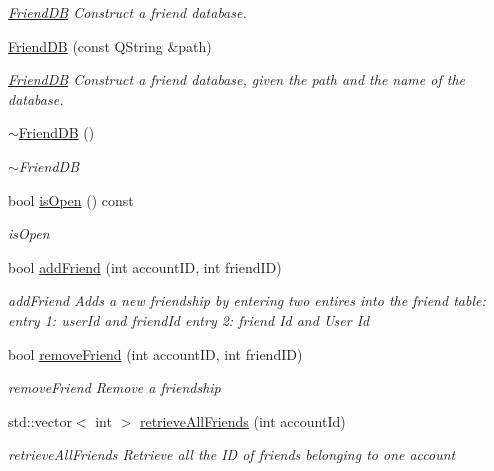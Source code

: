 \begin{DoxyCompactItemize}
\begin{DoxyCompactList}\small\item\em \hyperlink{classFriendDB}{Friend\+DB} Construct a friend database. \end{DoxyCompactList}\item 
\hyperlink{classFriendDB_aeb06351e9332d761fc3198afc0ffc1ef}{Friend\+DB} (const Q\+String \&path)
\begin{DoxyCompactList}\small\item\em \hyperlink{classFriendDB}{Friend\+DB} Construct a friend database, given the path and the name of the database. \end{DoxyCompactList}\item 
\hyperlink{classFriendDB_a405b76fd45f4a0043744ba95b6badeb8}{$\sim$\+Friend\+DB} ()
\begin{DoxyCompactList}\small\item\em $\sim$\+Friend\+DB \end{DoxyCompactList}\item 
bool \hyperlink{classFriendDB_a8612c6ab65fa9e7cdb976302f9a8e0f3}{is\+Open} () const 
\begin{DoxyCompactList}\small\item\em is\+Open \end{DoxyCompactList}\item 
bool \hyperlink{classFriendDB_a8ceb2289939679e2070badfc687a2547}{add\+Friend} (int account\+ID, int friend\+ID)
\begin{DoxyCompactList}\small\item\em add\+Friend Adds a new friendship by entering two entires into the friend table\+: entry 1\+: user\+Id and friend\+Id entry 2\+: friend Id and User Id \end{DoxyCompactList}\item 
bool \hyperlink{classFriendDB_a1f1fbe2b57f94792fa7d135573878561}{remove\+Friend} (int account\+ID, int friend\+ID)
\begin{DoxyCompactList}\small\item\em remove\+Friend Remove a friendship \end{DoxyCompactList}\item 
std\+::vector$<$ int $>$ \hyperlink{classFriendDB_aa3e745aeeed7d329b93474389bdd7203}{retrieve\+All\+Friends} (int account\+Id)
\begin{DoxyCompactList}\small\item\em retrieve\+All\+Friends Retrieve all the ID of friends belonging to one account \end{DoxyCompactList}\item 

\end{DoxyCompactItemize}
